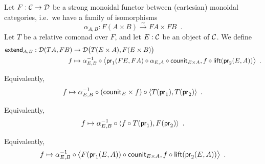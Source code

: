 \documentclass{amsart}
\begin{document}
\begin{definition}\label{def:extend}
 Let $F : \C\to \D$ be a strong monoidal functor between (cartesian) monoidal categories, 
 i.e.\ we have a family of isomorphisms
  \[ \alpha_{A,B} : F(A\times B) \xrightarrow{\sim} FA\times FB\enspace . \] 
  Let $T$ be a relative comonad over $F$, and let $E : \C$ be an object of $\C$.
 We define
 \begin{align*} \extend_{A,B} : \D(TA,FB) &\to \D\bigl(T(E\times A),F(E\times B)\bigr)\\
                                   f   &\mapsto \comp{\bigl\langle \comp{\counit_{E\times A}}{\comp{\alpha_{E,A}}{\pr_1(FE,FA)}}, \comp{\lift(\pr_2(E,A))}{f} \bigr\rangle}{\alpha_{E,B}^{-1}} \enspace .
\end{align*}

Equivalently,
  \[ f   \mapsto \comp{\comp{\langle T(\pr_1) , T(\pr_2) \rangle}{(\counit_E\times f)}}{\alpha_{E,B}^{-1}} \enspace .
  \]

  
Equivalently,
  \[ f   \mapsto \comp{\langle \comp{T(\pr_1)}{f} , F(\pr_2) \rangle}{\alpha_{E,B}^{-1}} \enspace .
  \]
  
Equivalently,
  \[f  \mapsto \comp{\bigl\langle \comp{\counit_{E\times A}}{F(\pr_1(E,A))}, \comp{\lift(\pr_2(E,A))}{f} \bigr\rangle}{\alpha_{E,B}^{-1}} \enspace .
  \]
\end{definition}
\end{document}
